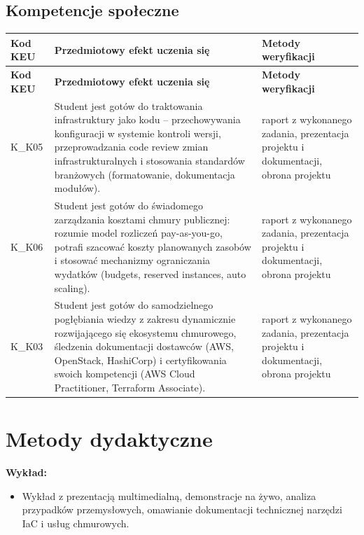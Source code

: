 \documentclass[12pt, a4paper]{article}
\newcommand{\thdrule}{\noalign{\global\setlength{\extrarowheight}{0pt}}}
\newcommand{\thdend}{\noalign{\global\setlength{\extrarowheight}{3pt}}}
\begin{document}
\subsection*{Kompetencje społeczne}
{\scriptsize
\begin{longtable}{m{1.6cm}m{9.0cm}m{4.2cm}}
\thdrule\toprule
\rowcolor{pjatkRed} {\color{white}\footnotesize\textbf{\vphantom{Ag}Kod KEU}} & {\color{white}\footnotesize\textbf{\vphantom{Ag}Przedmiotowy efekt uczenia się}} & {\color{white}\footnotesize\textbf{\vphantom{Ag}Metody weryfikacji}} \\
\midrule\thdend
\endfirsthead
\thdrule\toprule
\rowcolor{pjatkRed} {\color{white}\footnotesize\textbf{\vphantom{Ag}Kod KEU}} & {\color{white}\footnotesize\textbf{\vphantom{Ag}Przedmiotowy efekt uczenia się}} & {\color{white}\footnotesize\textbf{\vphantom{Ag}Metody weryfikacji}} \\
\midrule\thdend
\endhead
  \rowcolor{tableRowLight} K\_K05 & Student jest gotów do traktowania infrastruktury jako kodu – przechowywania konfiguracji w systemie kontroli wersji, przeprowadzania code review zmian infrastrukturalnych i stosowania standardów branżowych (formatowanie, dokumentacja modułów). & raport z wykonanego zadania, prezentacja projektu i dokumentacji, obrona projektu \\
  \rowcolor{tableRowAlt} K\_K06 & Student jest gotów do świadomego zarządzania kosztami chmury publicznej: rozumie model rozliczeń pay-as-you-go, potrafi szacować koszty planowanych zasobów i stosować mechanizmy ograniczania wydatków (budgets, reserved instances, auto scaling). & raport z wykonanego zadania, prezentacja projektu i dokumentacji, obrona projektu \\
  \rowcolor{tableRowLight} K\_K03 & Student jest gotów do samodzielnego pogłębiania wiedzy z zakresu dynamicznie rozwijającego się ekosystemu chmurowego, śledzenia dokumentacji dostawców (AWS, OpenStack, HashiCorp) i certyfikowania swoich kompetencji (AWS Cloud Practitioner, Terraform Associate). & raport z wykonanego zadania, prezentacja projektu i dokumentacji, obrona projektu \\
\bottomrule
\end{longtable}}

\section{Metody dydaktyczne}

\textbf{Wykład:}
\begin{itemize}
  \item Wykład z prezentacją multimedialną, demonstracje na żywo, analiza przypadków przemysłowych, omawianie dokumentacji technicznej narzędzi IaC i usług chmurowych.
\end{itemize}
\vspace{4pt}
\end{document}
